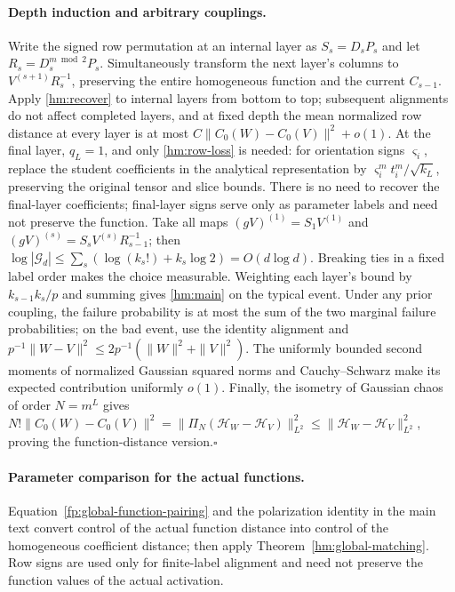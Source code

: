 \documentclass[a4paper]{tufte-handout}
\begin{document}
\begin{fullwidth}
\paragraph{Depth induction and arbitrary couplings.}
Write the signed row permutation at an internal layer as $S_s=D_sP_s$ and let
$R_s=D_s^{m\bmod2}P_s$. Simultaneously transform the next layer's columns to $V^{(s+1)}R_s^{-1}$,
preserving the entire homogeneous function and the current $C_{s-1}$.
Apply \eqref{hm:recover} to internal layers from bottom to top; subsequent alignments do not affect completed layers,
and at fixed depth the mean normalized row distance at every layer is at most $C\|C_0(W)-C_0(V)\|^2+o(1)$.
At the final layer, $q_L=1$, and only \eqref{hm:row-loss} is needed: for orientation signs $\varsigma_i$,
replace the student coefficients in the analytical representation by $\varsigma_i^m t_i^m/\sqrt{k_L}$, preserving the original tensor and slice bounds.
There is no need to recover the final-layer coefficients; final-layer signs serve only as parameter labels and need not preserve the function.
Take all maps
$(gV)^{(1)}=S_1V^{(1)}$ and $(gV)^{(s)}=S_sV^{(s)}R_{s-1}^{-1}$; then
$\log|\mathcal G_d|\le\sum_s(\log(k_s!)+k_s\log2)=O(d\log d)$.
Breaking ties in a fixed label order makes the choice measurable. Weighting each layer's bound by $k_{s-1}k_s/p$ and summing
gives \eqref{hm:main} on the typical event.
Under any prior coupling, the failure probability is at most the sum of the two marginal failure probabilities; on the bad event, use the identity alignment and
$p^{-1}\|W-V\|^2\le2p^{-1}(\|W\|^2+\|V\|^2)$.
The uniformly bounded second moments of normalized Gaussian squared norms and Cauchy--Schwarz make its expected contribution uniformly $o(1)$.
Finally, the isometry of Gaussian chaos of order $N=m^L$ gives
$N!\|C_0(W)-C_0(V)\|^2=\|\Pi_N(\mathcal H_W-\mathcal H_V)\|_{L^2}^2
\le\|\mathcal H_W-\mathcal H_V\|_{L^2}^2$, proving the function-distance version.\hfill$\square$

\paragraph{Parameter comparison for the actual functions.}
Equation~\eqref{fp:global-function-pairing} and the polarization identity in the main text convert control of the actual function distance into control of the homogeneous coefficient distance;
then apply Theorem~\ref{hm:global-matching}. Row signs are used only for finite-label alignment and need not preserve the function values of the actual activation.


\end{fullwidth}
\end{document}
